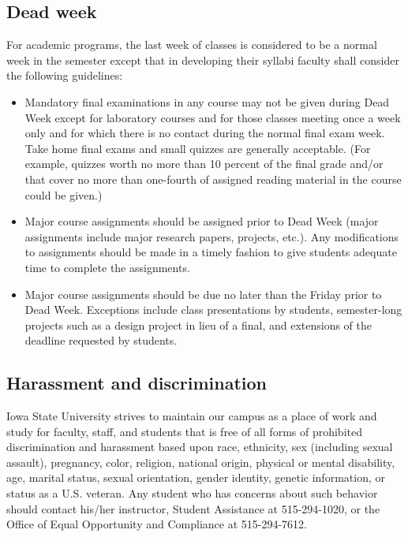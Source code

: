 \documentclass[nofonts]{tufte-handout}
\begin{document}
\subsection*{Dead week}

For academic programs, the last week of classes is considered to be a
normal week in the semester except that in developing their syllabi
faculty shall consider the following guidelines:

\begin{itemize}
\item Mandatory final examinations in any course may not be given
  during Dead Week except for laboratory courses and for those classes
  meeting once a week only and for which there is no contact during
  the normal final exam week. Take home final exams and small quizzes
  are generally acceptable. (For example, quizzes worth no more than
  10 percent of the final grade and/or that cover no more than
  one-fourth of assigned reading material in the course could be
  given.)
\item Major course assignments should be assigned prior to Dead Week
  (major assignments include major research papers, projects,
  etc.). Any modifications to assignments should be made in a timely
  fashion to give students adequate time to complete the assignments.
\item Major course assignments should be due no later than the Friday
  prior to Dead Week. Exceptions include class presentations by
  students, semester-long projects such as a design project in lieu of
  a final, and extensions of the deadline requested by students.
\end{itemize}

\subsection*{Harassment and discrimination}

Iowa State University strives to maintain our campus as a place of
work and study for faculty, staff, and students that is free of all
forms of prohibited discrimination and harassment based upon race,
ethnicity, sex (including sexual assault), pregnancy, color, religion,
national origin, physical or mental disability, age, marital status,
sexual orientation, gender identity, genetic information, or status as
a U.S. veteran. Any student who has concerns about such behavior
should contact his/her instructor, Student Assistance at 515-294-1020,
or the Office of Equal Opportunity and Compliance at 515-294-7612.
\end{document}
